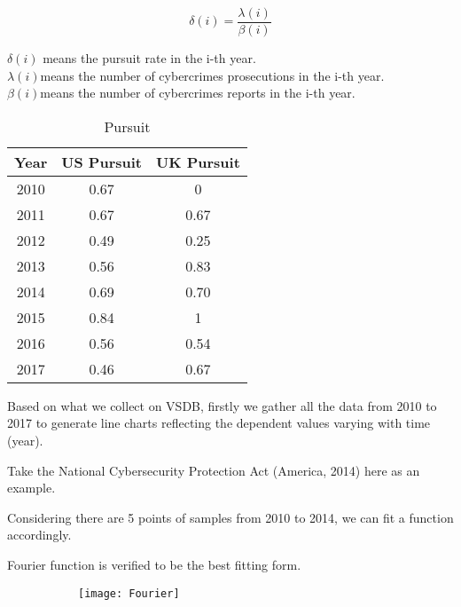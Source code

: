 \documentclass[12pt]{article}
\begin{document}
	 
	 \[ \delta(i) = \frac{\lambda(i)}{\beta(i)}\]
	 \begin{center}
	 	$\delta(i)$ means the pursuit rate in the i-th year. \\
	 	$\lambda(i)$means the number of cybercrimes prosecutions in the i-th year.\\
	 	$\beta(i)$means the number of cybercrimes reports in the i-th year.
	 \end{center}
	\begin{table}[H]
	\centering
	\caption{Pursuit}
	\label{tab:Pursuit}
	\begin{tabular}{|c|c|c|}
		
		\hline
		Year & US Pursuit & UK Pursuit\\
		\hline
		2010 & 0.67 & 0 \\
		\hline
		2011 & 0.67 & 0.67 \\
		\hline
		2012 & 0.49 & 0.25 \\
		\hline
		2013 & 0.56 & 0.83\\
		\hline
		2014& 0.69& 0.70\\
		\hline
		2015& 0.84 & 1\\
		\hline
		2016& 0.56 & 0.54\\
		\hline
		2017& 0.46 & 0.67\\
		\hline
		
	\end{tabular}
	
\end{table}


	 
	 
	 Based on what we collect on VSDB, firstly we gather all the data from 2010 to 2017 to generate line charts reflecting the dependent values varying with time (year).
	 
	 
	 
	 Take the National Cybersecurity Protection Act (America, 2014) here as an example.
	 
	 Considering there are 5 points of samples from 2010 to 2014, we can fit a function accordingly. 
	 
	 Fourier function is verified to be the best fitting form.
	 
	 
	 	 			\begin{figure}[H]
	 	
	 	\centering
	 	\begin{subfigure}
	 		\centering
	 		\texttt{[image: Fourier]}
	 		\label{Fourier}
	 	\end{subfigure}
	 	
	 \end{figure}
	 
\end{document}
